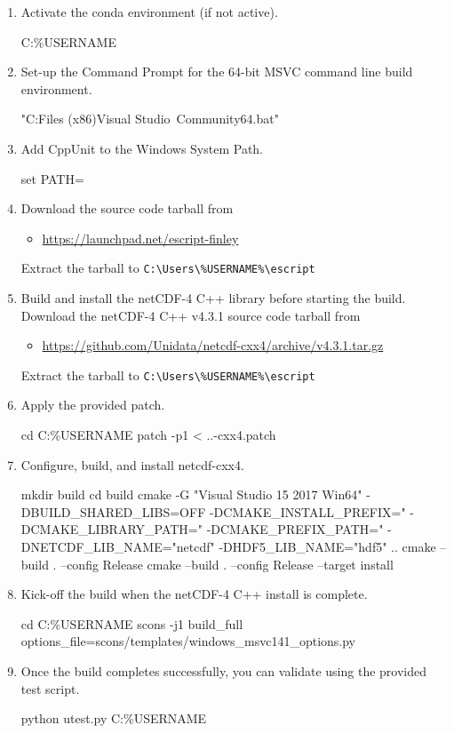 \begin{enumerate}
\item Activate the conda environment (if not active).
\begin{shellCode}
C:\Users\%USERNAME%
\end{shellCode}
\item Set-up the Command Prompt for the 64-bit MSVC command line build environment.
\begin{shellCode}
"C:\Program Files (x86)\Microsoft Visual Studio\
    Community\VC\Auxiliary\Build\vcvars64.bat"
\end{shellCode}
\item Add CppUnit to the Windows System Path.
\begin{shellCode}
set PATH=%
\end{shellCode}
\item Download the \escript source code tarball from
\begin{itemize}
\item[] \url{https://launchpad.net/escript-finley}
\end{itemize}
Extract the tarball to \verb!C:\Users\%USERNAME%\escript!
\item Build and install the netCDF-4 C++ library before starting the \escript
build.  Download the netCDF-4 C++ v4.3.1 source code tarball from
\begin{itemize}
\item[] \url{https://github.com/Unidata/netcdf-cxx4/archive/v4.3.1.tar.gz}
\end{itemize}
Extract the tarball to \verb!C:\Users\%USERNAME%\escript!
\item Apply the provided patch.
\begin{shellCode}
cd C:\Users\%USERNAME%
patch -p1 < ..\src\tools\anaconda{}\netcdf-cxx4.patch
\end{shellCode}
\item Configure, build, and install netcdf-cxx4.
\begin{shellCode}
mkdir build
cd build
cmake -G "Visual Studio 15 2017 Win64" -DBUILD_SHARED_LIBS=OFF
    -DCMAKE_INSTALL_PREFIX="%
    -DCMAKE_LIBRARY_PATH="%
    -DCMAKE_PREFIX_PATH="%
    -DNETCDF_LIB_NAME="netcdf" -DHDF5_LIB_NAME="hdf5" ..
cmake --build . --config Release
cmake --build . --config Release --target install
\end{shellCode}
\item Kick-off the \escript build when the netCDF-4 C++ install is complete.
\begin{shellCode}
cd C:\Users\%USERNAME%
scons -j1 build_full options_file=scons/templates/windows_msvc141_options.py
\end{shellCode}
\item Once the build completes successfully, you can validate \escript using
the provided test script.
\begin{shellCode}
python utest.py C:\Users\%USERNAME%
\end{shellCode}
\end{enumerate}

